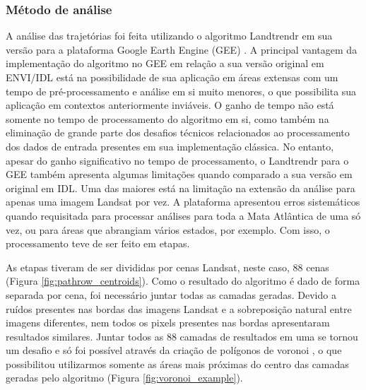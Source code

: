 \subsubsection{Método de análise}
\hspace{13pt} A análise das trajetórias foi feita utilizando o algoritmo Landtrendr em sua versão para a plataforma Google Earth Engine (GEE) \citep{Kennedy2018}. A principal vantagem da implementação do algoritmo no GEE em relação a sua versão original em ENVI/IDL está na possibilidade de sua aplicação em áreas extensas com um tempo de pré-processamento e análise em si muito menores, o que possibilita sua aplicação em contextos anteriormente inviáveis. O ganho de tempo não está somente no tempo de processamento do algoritmo em si, como também na eliminação de grande parte dos desafios técnicos relacionados ao processamento dos dados de entrada presentes em sua implementação clássica. No entanto, apesar do ganho significativo no tempo de processamento, o Landtrendr para o GEE também apresenta algumas limitações quando comparado a sua versão em original em IDL. Uma das maiores está na limitação na extensão da análise para apenas uma imagem Landsat por vez. A plataforma apresentou erros sistemáticos quando requisitada para processar análises para toda a Mata Atlântica de uma só vez, ou para áreas que abrangiam vários estados, por exemplo. Com isso, o processamento teve de ser feito em etapas. 

As etapas tiveram de ser divididas por cenas Landsat, neste caso, 88 cenas (Figura \ref{fig:pathrow_centroids}). Como o resultado do algoritmo é dado de forma separada por cena, foi necessário juntar todas as camadas geradas. Devido a ruídos presentes nas bordas das imagens Landsat e a sobreposição natural entre imagens diferentes, nem todos os pixels presentes nas bordas apresentaram resultados similares. Juntar todos as 88 camadas de resultados em uma se tornou um desafio e só foi possível através da criação de polígonos de voronoi \citep{Okabe}, o que possibilitou utilizarmos somente as áreas mais próximas do centro das camadas geradas pelo algoritmo (Figura \ref{fig:voronoi_example}).

